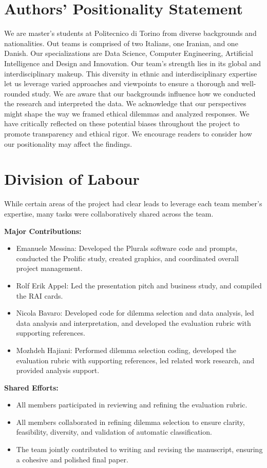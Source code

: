 \documentclass[sigconf, authorversion, nonacm, screen]{acmart}
\begin{document}
\section{Authors' Positionality Statement}

We are master’s students at Politecnico di Torino from diverse backgrounds and nationalities.
Out teams is comprised of two Italians, one Iranian, and one Danish. 
Our specializations are Data Science, Computer Engineering, Artificial Intelligence and Design and Innovation.
Our team’s strength lies in its global and interdisciplinary makeup. This diversity in ethnic and interdisciplinary expertise let us leverage varied approaches and viewpoints to ensure a thorough and well-rounded study. 
We are aware that our backgrounds influence how we conducted the research and interpreted the data. 
We acknowledge that our perspectives might shape the way we framed ethical dilemmas and analyzed responses.
We have critically reflected on these potential biases throughout the project to promote transparency and ethical rigor. 
We encourage readers to consider how our positionality may affect the findings.

\section{Division of Labour}

While certain areas of the project had clear leads to leverage each team member’s expertise, many tasks were collaboratively shared across the team.

\textbf{Major Contributions:}
\begin{itemize}
  \item {Emanuele Messina:} Developed the Plurals software code and prompts, conducted the Prolific study, created graphics, and coordinated overall project management.
  \item {Rolf Erik Appel:} Led the presentation pitch and business study, and compiled the RAI cards.
  \item {Nicola Bavaro:} Developed code for dilemma selection and data analysis, led data analysis and interpretation, and developed the evaluation rubric with supporting references.
  \item {Mozhdeh Hajiani:} Performed dilemma selection coding, developed the evaluation rubric with supporting references, led related work research, and provided analysis support.
\end{itemize}

\textbf{Shared Efforts:}
\begin{itemize}
  \item All members participated in reviewing and refining the evaluation rubric.
  \item All members collaborated in refining dilemma selection to ensure clarity, feasibility, diversity, and validation of automatic classification.
  \item The team jointly contributed to writing and revising the manuscript, ensuring a cohesive and polished final paper.
\end{itemize}
\end{document}
